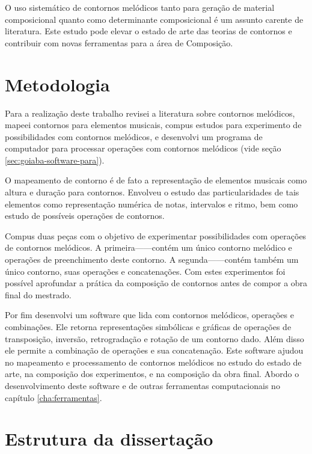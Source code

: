 O uso sistemático de contornos melódicos tanto para geração de
material composicional quanto como determinante composicional é um
assunto carente de literatura. Este estudo pode elevar o estado de
arte das teorias de contornos e contribuir com novas ferramentas para
a área de Composição.

\section{Metodologia}
\label{sec:metodologia}


Para a realização deste trabalho revisei a literatura sobre contornos
melódicos, mapeei contornos para elementos musicais, compus estudos
para experimento de possibilidades com contornos melódicos, e
desenvolvi um programa de computador para processar operações com
contornos melódicos (vide seção \ref{sec:goiaba-software-para}).

O mapeamento de contorno é de fato a representação de elementos
musicais como altura e duração para contornos. Envolveu o estudo das
particularidades de tais elementos como representação numérica de
notas, intervalos e ritmo, bem como estudo de possíveis operações de
contornos.

Compus duas peças com o objetivo de experimentar possibilidades com
operações de contornos melódicos. A primeira------contém um único contorno
melódico e operações de preenchimento deste contorno. A
segunda------contém também um único
contorno, suas operações e concatenações. Com estes experimentos foi
possível aprofundar a prática da composição de contornos antes de
compor a obra final do mestrado.

Por fim desenvolvi um software que lida com contornos melódicos,
operações e combinações. Ele retorna representações simbólicas e
gráficas de operações de transposição, inversão, retrogradação e
rotação de um contorno dado. Além disso ele permite a combinação de
operações e sua concatenação. Este software ajudou no mapeamento e
processamento de contornos melódicos no estudo do estado de arte, na
composição dos experimentos, e na composição da obra final. Abordo o
desenvolvimento deste software e de outras ferramentas computacionais
no capítulo \ref{cha:ferramentas}.

\section{Estrutura da dissertação}
\label{sec:estr-da-diss}


